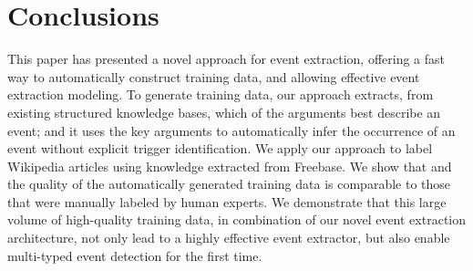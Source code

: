\section{Conclusions}
This paper has presented a novel approach for event extraction, offering a fast way to automatically construct training data, and allowing
effective event extraction modeling.  To generate training data, our approach extracts, from existing structured knowledge bases, which of
the arguments best describe an event; and it uses the key arguments to automatically infer the occurrence of an event without explicit
trigger identification. We apply our approach to label Wikipedia articles using knowledge extracted from Freebase. We show that and the
quality of the automatically generated training data is comparable to those that were manually labeled by human experts.  We demonstrate
that this large volume of high-quality training data, in combination of our novel event extraction architecture,  not only lead to a highly
effective event extractor, but also enable multi-typed event detection for the first time. 




%
